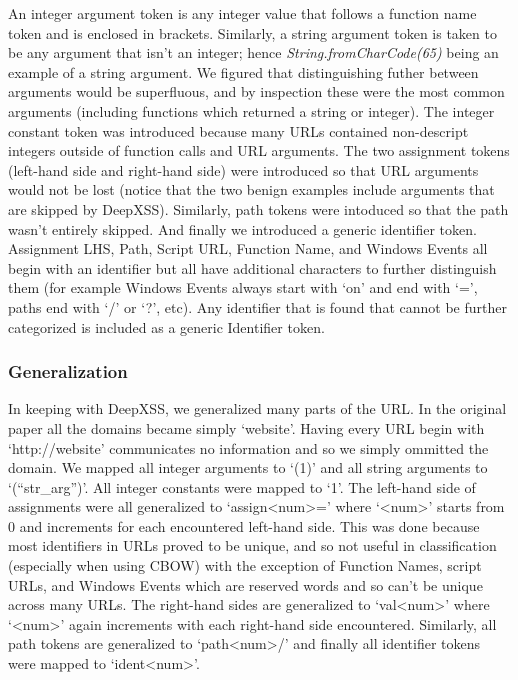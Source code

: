 An integer argument token is any integer value that follows a function name token and is enclosed in brackets. Similarly, a string argument token is taken to be any argument that isn't an integer; hence \textit{String.fromCharCode(65)} being an example of a string argument. We figured that distinguishing futher between arguments would be superfluous, and by inspection these were the most common arguments (including functions which returned a string or integer). The integer constant token was introduced because many URLs contained non-descript integers outside of function calls and URL arguments. The two assignment tokens (left-hand side and right-hand side) were introduced so that URL arguments would not be lost (notice that the two benign examples include arguments that are skipped by DeepXSS). Similarly, path tokens were intoduced so that the path wasn't entirely skipped. And finally we introduced a generic identifier token. Assignment LHS, Path, Script URL, Function Name, and Windows Events all begin with an identifier but all have additional characters to further distinguish them (for example Windows Events always start with `on' and end with `=', paths end with `/' or `?', etc). Any identifier that is found that cannot be further categorized is included as a generic Identifier token.

\subsubsection{Generalization}
In keeping with DeepXSS, we generalized many parts of the URL. In the original paper all the domains became simply `website'. Having every URL begin with `http://website' communicates no information and so we simply ommitted the domain. We mapped all integer arguments to `(1)' and all string arguments to `(``str\_arg'')'. All integer constants were mapped to `1'. The left-hand side of assignments were all generalized to `assign<num>=' where `<num>' starts from 0 and increments for each encountered left-hand side. This was done because most identifiers in URLs proved to be unique, and so not useful in classification (especially when using CBOW) with the exception of Function Names, script URLs, and Windows Events which are reserved words and so can't be unique across many URLs. The right-hand sides are generalized to `val<num>' where `<num>' again increments with each right-hand side encountered. Similarly, all path tokens are generalized to `path<num>/' and finally all identifier tokens were mapped to `ident<num>'.

